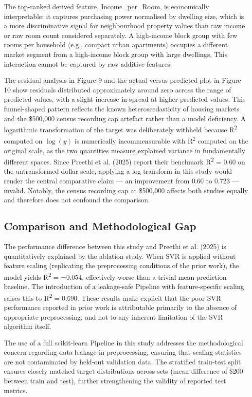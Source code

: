 \documentclass[pdflatex,sn-mathphys-num]{sn-jnl}
\begin{document}
The top-ranked derived feature, Income\_per\_Room, is economically interpretable: it captures purchasing power normalised by dwelling size, which is a more discriminative signal for neighbourhood property values than raw income or raw room count considered separately. A high-income block group with few rooms per household (e.g., compact urban apartments) occupies a different market segment from a high-income block group with large dwellings. This interaction cannot be captured by raw additive features.

The residual analysis in Figure 9 and the actual-versus-predicted plot in Figure 10 show residuals distributed approximately around zero across the range of predicted values, with a slight increase in spread at higher predicted values. This funnel-shaped pattern reflects the known heteroscedasticity of housing markets and the \$500,000 census recording cap artefact rather than a model deficiency. A logarithmic transformation of the target was deliberately withheld because R\textsuperscript{2} computed on $\log(y)$ is numerically incommensurable with R\textsuperscript{2} computed on the original scale, as the two quantities measure explained variance in fundamentally different spaces. Since Preethi et al. (2025) report their benchmark R\textsuperscript{2} = 0.60 on the untransformed dollar scale, applying a log-transform in this study would render the central comparative claim — an improvement from 0.60 to 0.723 — invalid. Notably, the census recording cap at \$500,000 affects both studies equally and therefore does not confound the comparison.

\subsection{Comparison and Methodological Gap}
The performance difference between this study and Preethi et al. (2025) is quantitatively explained by the ablation study. When SVR is applied without feature scaling (replicating the preprocessing conditions of the prior work), the model yields R\textsuperscript{2} = $-$0.054, effectively worse than a trivial mean-prediction baseline. The introduction of a leakage-safe Pipeline with feature-specific scaling raises this to R\textsuperscript{2} = 0.690. These results make explicit that the poor SVR performance reported in prior work is attributable primarily to the absence of appropriate preprocessing, and not to any inherent limitation of the SVR algorithm itself.

The use of a full scikit-learn Pipeline in this study addresses the methodological concern regarding data leakage in preprocessing, ensuring that scaling statistics are not contaminated by held-out validation data. The stratified train-test split ensures closely matched target distributions across sets (mean difference of \$200 between train and test), further strengthening the validity of reported test metrics.
\end{document}
